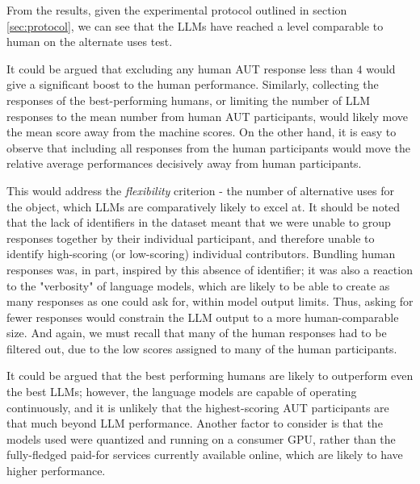 \documentclass{article}
\begin{document}
From the results, given the experimental protocol outlined in section \ref{sec:protocol}, we can see that the LLMs have reached a level comparable to human on the alternate uses test.  

It could be argued that excluding any human AUT response less than $4$ would give a significant boost to the human performance.  Similarly, collecting the responses of the best-performing humans, or limiting the number of LLM responses to the mean number from human AUT participants, would likely move the mean score away from the machine scores. On the other hand, it is easy to observe that including all responses from the human participants would move the relative average performances decisively away from human participants.   
 
This would address the \emph{flexibility} criterion - the number of alternative uses for the object, which LLMs are comparatively likely to excel at. It should be noted that the lack of identifiers in the dataset meant that we were unable to group responses together by their individual participant, and therefore unable to identify high-scoring (or low-scoring) individual contributors. Bundling human responses was, in part, inspired by this absence of identifier; it was also a reaction to the "verbosity" of language models, which are likely to be able to create as many responses as one could ask for, within model output limits. Thus, asking for fewer responses would constrain the LLM output to a more human-comparable size. And again, we must recall that many of the human responses had to be filtered out, due to the low scores assigned to many of the human participants. 

It could be argued that the best performing humans are likely to outperform even the best LLMs; however, the language models are capable of operating continuously, and it is unlikely that the highest-scoring AUT participants are that much beyond LLM performance. Another factor to consider is that the models used were quantized and running on a consumer GPU, rather than the fully-fledged paid-for services currently available online, which are likely to have higher performance.  


\end{document}
